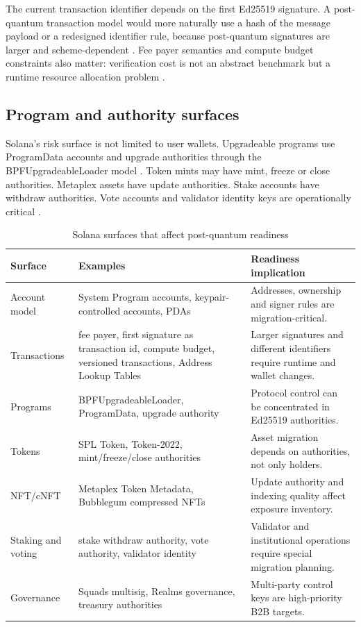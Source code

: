 \documentclass[11pt,a4paper,oneside,parskip=false]{scrartcl}
\begin{document}
The current transaction identifier depends on the first Ed25519 signature. A post-quantum transaction model would more naturally use a hash of the message payload or a redesigned identifier rule, because post-quantum signatures are larger and scheme-dependent \cite{helius-solana-pq,solana-docs-transactions}. Fee payer semantics and compute budget constraints also matter: verification cost is not an abstract benchmark but a runtime resource allocation problem \cite{solana-docs-fees}.

\subsection{Program and authority surfaces}

Solana's risk surface is not limited to user wallets. Upgradeable programs use ProgramData accounts and upgrade authorities through the BPFUpgradeableLoader model \cite{solana-docs-program-deployment}. Token mints may have mint, freeze or close authorities. Metaplex assets have update authorities. Stake accounts have withdraw authorities. Vote accounts and validator identity keys are operationally critical \cite{solana-token-basics,metaplex-token-metadata,metaplex-update-assets,solana-docs-stake-accounts,solana-rpc-getvoteaccounts,anza-vote-account-management}.

\begin{table}[htbp]
\centering
\caption{Solana surfaces that affect post-quantum readiness}
\label{tab:solana-surfaces}
\small
\begin{tabularx}{\textwidth}{L{0.25\textwidth}Y Y}
\toprule
\textbf{Surface} & \textbf{Examples} & \textbf{Readiness implication} \\
\midrule
Account model & System Program accounts, keypair-controlled accounts, PDAs & Addresses, ownership and signer rules are migration-critical. \\
Transactions & fee payer, first signature as transaction id, compute budget, versioned transactions, Address Lookup Tables & Larger signatures and different identifiers require runtime and wallet changes. \\
Programs & BPFUpgradeableLoader, ProgramData, upgrade authority & Protocol control can be concentrated in Ed25519 authorities. \\
Tokens & SPL Token, Token-2022, mint/freeze/close authorities & Asset migration depends on authorities, not only holders. \\
NFT/cNFT & Metaplex Token Metadata, Bubblegum compressed NFTs & Update authority and indexing quality affect exposure inventory. \\
Staking and voting & stake withdraw authority, vote authority, validator identity & Validator and institutional operations require special migration planning. \\
Governance & Squads multisig, Realms governance, treasury authorities & Multi-party control keys are high-priority B2B targets. \\
\bottomrule
\end{tabularx}
\end{table}
\end{document}
